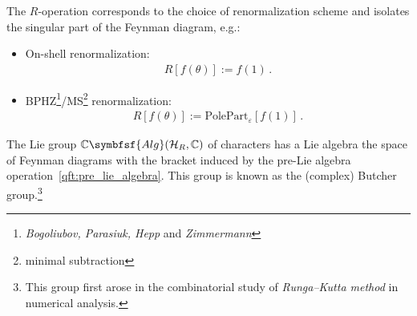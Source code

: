     The $R$-operation corresponds to the choice of renormalization scheme and isolates the singular part of the Feynman diagram, e.g.:
    \begin{itemize}
        \item On-shell renormalization:
        \begin{gather}
            R[f(\theta)] := f(1)\,.
        \end{gather}
        \item BPHZ\footnote{\textit{Bogoliubov, Parasiuk, Hepp} and \textit{Zimmermann}}/MS\footnote{minimal subtraction} renormalization:
        \begin{gather}
            R[f(\theta)] := \mathrm{PolePart}_\varepsilon[f(1)]\,.
        \end{gather}
    \end{itemize}

    \begin{property}
        The Lie group $\mathbb{C}\symbfsf{Alg}(\mathcal{H}_R,\mathbb{C})$ of characters has a Lie algebra the space of Feynman diagrams with the bracket induced by the pre-Lie algebra operation~\eqref{qft:pre_lie_algebra}. This group is known as the (complex) Butcher group.\footnote{This group first arose in the combinatorial study of \textit{Runga--Kutta method} in numerical analysis.}
    \end{property}

